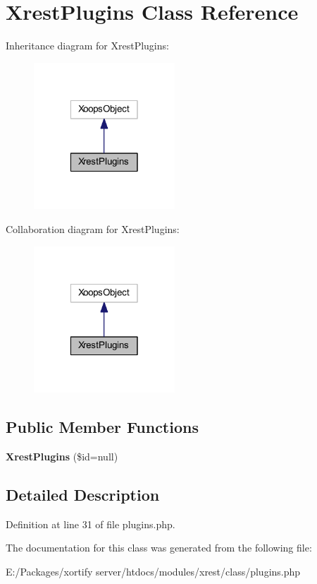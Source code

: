 \hypertarget{class_xrest_plugins}{\section{Xrest\-Plugins Class Reference}
\label{class_xrest_plugins}
}


Inheritance diagram for Xrest\-Plugins\-:
\nopagebreak
\begin{figure}[H]
\begin{center}
\leavevmode
\includegraphics[width=150pt]{class_xrest_plugins__inherit__graph}
\end{center}
\end{figure}


Collaboration diagram for Xrest\-Plugins\-:
\nopagebreak
\begin{figure}[H]
\begin{center}
\leavevmode
\includegraphics[width=150pt]{class_xrest_plugins__coll__graph}
\end{center}
\end{figure}
\subsection*{Public Member Functions}
\begin{DoxyCompactItemize}
\item 
\hypertarget{class_xrest_plugins_adb97776d991bdabae71c0ec7329da725}{{\bfseries Xrest\-Plugins} (\$id=null)}\label{class_xrest_plugins_adb97776d991bdabae71c0ec7329da725}

\end{DoxyCompactItemize}


\subsection{Detailed Description}


Definition at line 31 of file plugins.\-php.



The documentation for this class was generated from the following file\-:\begin{DoxyCompactItemize}
\item 
E\-:/\-Packages/xortify server/htdocs/modules/xrest/class/plugins.\-php\end{DoxyCompactItemize}
